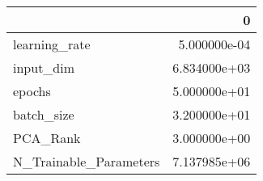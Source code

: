 \begin{tabular}{lr}
\toprule
{} &             0 \\
\midrule
learning\_rate          &  5.000000e-04 \\
input\_dim              &  6.834000e+03 \\
epochs                 &  5.000000e+01 \\
batch\_size             &  3.200000e+01 \\
PCA\_Rank               &  3.000000e+00 \\
N\_Trainable\_Parameters &  7.137985e+06 \\
\bottomrule
\end{tabular}
